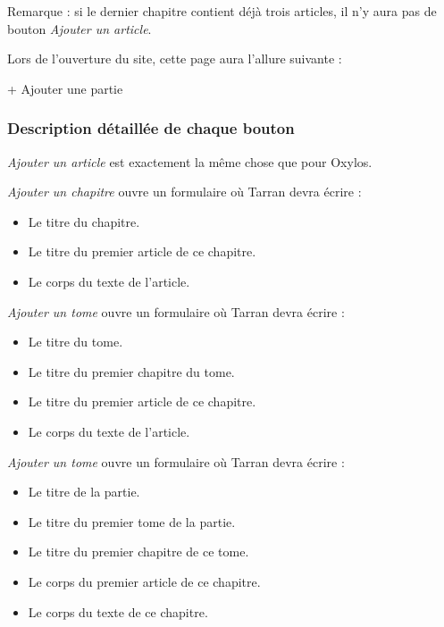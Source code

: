 \documentclass[french]{report}
\theoremstyle{plain}
\begin{document}
			\phantom{troud}

			Remarque : si le dernier chapitre contient déjà trois articles, il n'y aura pas de bouton \emph{Ajouter un article}.

			Lors de l'ouverture du site, cette page aura l'allure suivante :

			\begin{bfseries} + Ajouter une partie \end{bfseries}

			\subsubsection{Description détaillée de chaque bouton}

				\emph{Ajouter un article} est exactement la même chose que pour Oxylos.

				\emph{Ajouter un chapitre} ouvre un formulaire où Tarran devra écrire :
				\begin{itemize}
					\item Le titre du chapitre.
					\item Le titre du premier article de ce chapitre.
					\item Le corps du texte de l'article.
				\end{itemize}

				\emph{Ajouter un tome}
				ouvre un formulaire où Tarran devra écrire :
				\begin{itemize}
					\item Le titre du tome.
					\item Le titre du premier chapitre du tome.
					\item Le titre du premier article de ce chapitre.
					\item Le corps du texte de l'article.
				\end{itemize}

				\emph{Ajouter un tome} ouvre un formulaire où Tarran devra écrire :
				\begin{itemize}
					\item Le titre de la partie.
					\item Le titre du premier tome de la partie.
					\item Le titre du premier chapitre de ce tome.
					\item Le corps du premier article de ce chapitre.
					\item Le corps du texte de ce chapitre.
				\end{itemize}
\end{document}
